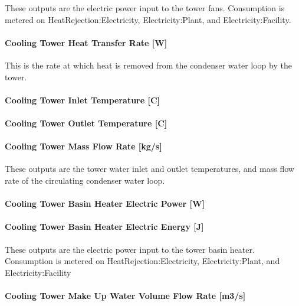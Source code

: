 These outputs are the electric power input to the tower fans. Consumption is metered on HeatRejection:Electricity, Electricity:Plant, and Electricity:Facility.

\paragraph{Cooling Tower Heat Transfer Rate {[}W{]}}\label{cooling-tower-heat-transfer-rate-w}

This is the rate at which heat is removed from the condenser water loop by the tower.

\paragraph{Cooling Tower Inlet Temperature {[}C{]}}\label{cooling-tower-inlet-temperature-c}

\paragraph{Cooling Tower Outlet Temperature {[}C{]}}\label{cooling-tower-outlet-temperature-c}

\paragraph{Cooling Tower Mass Flow Rate {[}kg/s{]}}\label{cooling-tower-mass-flow-rate-kgs}

These outputs are the tower water inlet and outlet temperatures, and mass flow rate of the circulating condenser water loop.

\paragraph{Cooling Tower Basin Heater Electric Power {[}W{]}}\label{cooling-tower-basin-heater-electric-power-w}

\paragraph{Cooling Tower Basin Heater Electric Energy {[}J{]}}\label{cooling-tower-basin-heater-electric-energy-j}

These outputs are the electric power input to the tower basin heater. Consumption is metered on HeatRejection:Electricity, Electricity:Plant, and Electricity:Facility

\paragraph{Cooling Tower Make Up Water Volume Flow Rate {[}m3/s{]}}\label{cooling-tower-make-up-water-volume-flow-rate-m3s}

